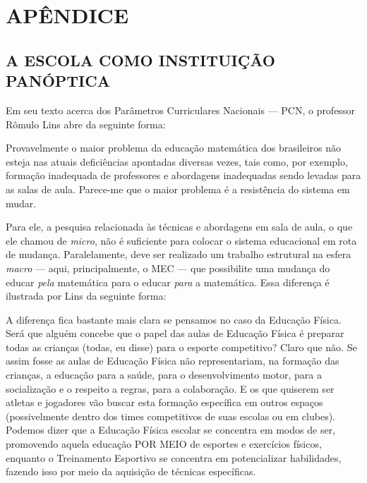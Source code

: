 \documentclass[
  12pt,
  letterpaper,
  DIV=11,
  numbers=noendperiod]{scrartcl}
\newenvironment{citacao}
    {\begin{quoting}[rightmargin=0cm,leftmargin=4cm]
    \begin{singlespace}
    \footnotesize
    }
    {\end{singlespace}
    \end{quoting}
}
\begin{document}


\newpage

\hypertarget{apuxeandice}{%
\section*{APÊNDICE}\label{apuxeandice}}

\hypertarget{a-escola-como-instituiuxe7uxe3o-panuxf3ptica}{%
\subsection{A ESCOLA COMO INSTITUIÇÃO
PANÓPTICA}\label{a-escola-como-instituiuxe7uxe3o-panuxf3ptica}}

Em seu texto acerca dos Parâmetros Curriculares Nacionais --- PCN, o
professor Rômulo Lins abre da seguinte forma:

\begin{citacao}
Provavelmente o maior problema da educação matemática dos brasileiros não esteja nas atuais deficiências apontadas diversas vezes, tais como, por exemplo, formação inadequada de professores e abordagens inadequadas sendo levadas para as salas de aula. Parece-me que o maior
problema é a resistência do sistema em mudar. \citep{lins}
\end{citacao}

Para ele, a pesquisa relacionada às técnicas e abordagens em sala de
aula, o que ele chamou de \emph{micro}, não é suficiente para colocar o
sistema educacional em rota de mudança. Paralelamente, deve ser
realizado um trabalho estrutural na esfera \emph{macro} --- aqui,
principalmente, o MEC --- que possibilite uma mudança do educar
\emph{pela} matemática para o educar \emph{para} a matemática. Essa
diferença é ilustrada por Lins da seguinte forma:

\begin{citacao}
A diferença fica bastante mais clara se pensamos no caso da Educação Física. Será que alguém concebe que o papel das aulas de Educação Física é preparar todas as crianças (todas, eu disse) para o esporte competitivo? Claro que não. Se assim fosse as aulas de Educação Física não representariam, na formação das crianças, a educação para a saúde, para o desenvolvimento motor, para a socialização e o respeito a regras, para a colaboração. E os que quiserem ser atletas e jogadores vão buscar esta formação específica em outros espaços (possivelmente dentro dos times competitivos de suas escolas ou em clubes). Podemos dizer que a Educação Física escolar se concentra em modos de ser, promovendo aquela educação POR MEIO de esportes e exercícios físicos, enquanto o Treinamento Esportivo se concentra em potencializar habilidades, fazendo isso por meio da aquisição de técnicas específicas. \citep{lins}
\end{citacao}
\end{document}

